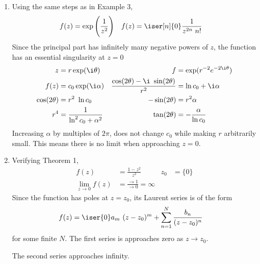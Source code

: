 \begin{enumerate}
    \item Using the same steps as in Example $ 3 $,
          \begin{align}
              f(z) & = \exp\Bigg( \frac{1}{z^2} \Bigg)  &
              f(z) & = \iser[n]{0} \frac{1}{z^{2n}\ n!}
          \end{align}
          Since the principal part has infinitely many negative powers of $ z $,
          the function has an essential singularity at $ z = 0 $
          \begin{align}
              z              & = r \exp(\i \theta)              &
              f              & = \exp(r^{-2} e^{-2\i \theta})     \\
              f(z)           & = c_0 \exp(\i \alpha)            &
              \frac{\cos(2\theta) - \i\ \sin(2\theta)}
              {r^2}          & = \ln c_0  + \i \alpha             \\
              \cos(2\theta)  & = r^2\ \ln c_0                   &
              -\sin(2\theta) & = r^2 \alpha                       \\
              r^4            & = \frac{1}{\ln^2 c_0 + \alpha^2} &
              \tan(2\theta)  & = -\frac{\alpha}{\ln c_0}
          \end{align}
          Increasing $ \alpha $ by multiples of $ 2\pi $, does not change $ c_0 $ while
          making $ r $ arbitrarily small. This means there is no limit when approaching
          $ z = 0 $.

    \item Verifying Theorem 1,
          \begin{align}
              f(z)                & = \frac{1 - z^2}{z^3}          &
              z_0                 & = \{0\}                          \\
              \lim_{z \to 0} f(z) & = \frac{\to 1}{\to 0} = \infty
          \end{align}
          Since the function has poles at $ z = z_0 $, its Laurent series is of the form
          \begin{align}
              f(z) & = \iser{0}a_m\ (z - z_0)^m + \sum_{n=1}^{N} \frac{b_n}{(z - z_0)^n}
          \end{align}
          for some finite $ N $. The first series is approaches zero as $ z \to z_0 $.
          \par The second series approaches infinity.


\end{enumerate}
